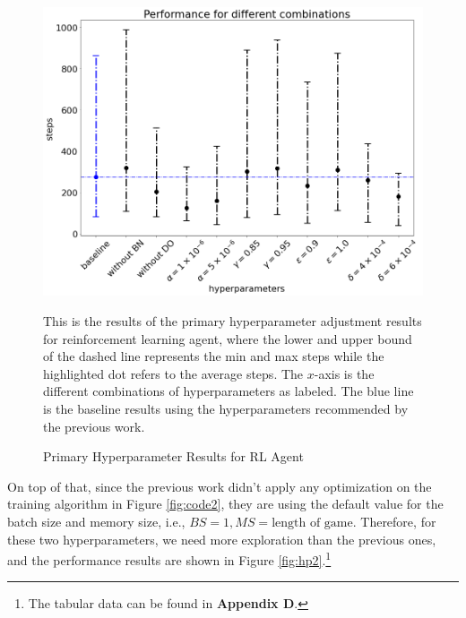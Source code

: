 \documentclass[letterpaper]{article} %
\begin{document}
\begin{itemize}
  \begin{figure}[h!]
    \centering
    \includegraphics[width=0.9\linewidth]{figures/HP1}
    \caption{Primary Hyperparameter Results for RL Agent}
    \medskip
    \footnotesize
    This is the results of the primary hyperparameter adjustment results for reinforcement learning agent, where the lower and upper bound of the dashed line represents the min and max steps while the highlighted dot refers to the average steps. The $x$-axis is the different combinations of hyperparameters as labeled. The blue line is the baseline results using the hyperparameters recommended by the previous work.
    \label{fig:hp1}
  \end{figure}

  On top of that, since the previous work didn't apply any optimization on the training algorithm in Figure \ref{fig:code2}, they are using the default value for the batch size and memory size, i.e., $BS=1, MS=\text{length of game}$. Therefore, for these two hyperparameters, we need more exploration than the previous ones, and the performance results are shown in Figure \ref{fig:hp2}.\footnote{The tabular data can be found in \textbf{Appendix D}.} 


\end{itemize}
\end{document}
